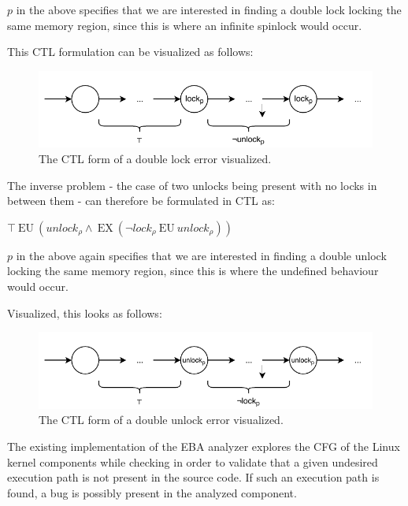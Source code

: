 \noindent $p$ in the above specifies that we are interested in finding a double lock locking the same memory region, since this is where an infinite spinlock would occur. 

\noindent This CTL formulation can be visualized as follows: 

\begin{figure}[h]
    \centering
    \includegraphics{background/figures/doublelock}
    \caption{The CTL form of a double lock error visualized.}
    \label{fig:doublelock}
\end{figure}

\noindent The inverse problem - the case of two unlocks being present with no locks in between them - can therefore be formulated in CTL as: 

\begin{center}
    $\top\:\mathrm{EU}\:\left({u n l o c k}_{\rho} \wedge\:\mathrm{EX}\:\left(\neg {l o c k}_{\rho}\:\mathrm{EU}\:{u n l o c k}_{\rho}\right)\right)$
\end{center}

\noindent $p$ in the above again specifies that we are interested in finding a double unlock locking the same memory region, since this is where the undefined behaviour would occur. 

\noindent Visualized, this looks as follows:

\begin{figure}[h]
    \centering
    \includegraphics{background/figures/doubleunlock}
    \caption{The CTL form of a double unlock error visualized.}
    \label{fig:doubleunlock}
\end{figure}

\noindent The existing implementation of the EBA analyzer explores the CFG of the Linux kernel components while checking in order to validate that a given undesired execution path is not present in the source code. If such an execution path is found, a bug is possibly present in the analyzed component. \\

